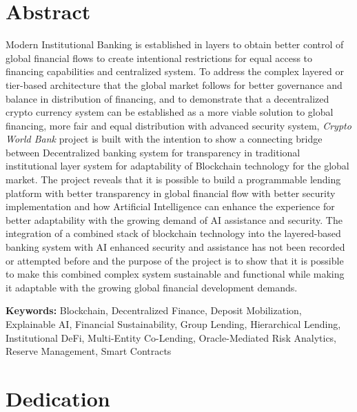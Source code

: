 \documentclass[12pt,a4paper]{report}
\begin{document}
\chapter*{Abstract}
{}

Modern Institutional Banking is established in layers to obtain better control of global financial flows to create intentional restrictions for equal access to financing capabilities and centralized system. To address the complex layered or tier-based architecture that the global market follows for better governance and balance in distribution of financing, and to demonstrate that a decentralized crypto currency system can be established as a more viable solution to global financing, more fair and equal distribution with advanced security system, \textit{Crypto World Bank} project is built with the intention to show a connecting bridge between Decentralized banking system for transparency in traditional institutional layer system for adaptability of Blockchain technology for the global market. The project reveals that it is possible to build a programmable lending platform with better transparency in global financial flow with better security implementation and how Artificial Intelligence can enhance the experience for better adaptability with the growing demand of AI assistance and security. The integration of a combined stack of blockchain technology into the layered-based banking system with AI enhanced security and assistance has not been recorded or attempted before and the purpose of the project is to show that it is possible to make this combined complex system sustainable and functional while making it adaptable with the growing global financial development demands.

\vspace{0.5em}
\noindent\textbf{Keywords:} Blockchain, Decentralized Finance, Deposit Mobilization, Explainable AI, Financial Sustainability, Group Lending, Hierarchical Lending, Institutional DeFi, Multi-Entity Co-Lending, Oracle-Mediated Risk Analytics, Reserve Management, Smart Contracts

\newpage
\thispagestyle{empty}

\chapter*{Dedication}
{}
\end{document}
